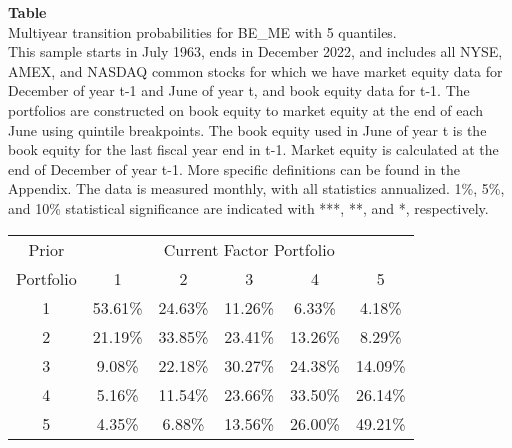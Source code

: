 \begin{table*}[ht!]
\raggedright
{}
\label{tab: multiyear_transition_probs_BE_ME_with_5_quantiles}
\textbf{Table \thetable} \\
Multiyear transition probabilities for BE_ME with 5 quantiles. \\
\hspace*{1em}This sample starts in July 1963, ends in December 2022, and includes all NYSE, AMEX, and NASDAQ common stocks for which we have market equity data for December of year t-1 and June of year t, and book equity data for t-1. The portfolios are constructed on book equity to market equity at the end of each June using quintile breakpoints.  The book equity used in June of year t is the book equity for the last fiscal year end in t-1.  Market equity is calculated at the end of December of year t-1.  More specific definitions can be found in the Appendix.  The data is measured monthly, with all statistics annualized.  1\%, 5\%, and 10\% statistical significance are indicated with ***, **, and *, respectively. \\
\vspace{0.5em}
\centering
\begin{adjustbox}{max width=\textwidth}
\begin{tabular}{@{}cccccc@{}}
\toprule
Prior & \multicolumn{5}{c}{Current Factor Portfolio} \\
Portfolio & 1 & 2 & 3 & 4 & 5 \\
\midrule
1 & 53.61\% & 24.63\% & 11.26\% & 6.33\% & 4.18\% \\
2 & 21.19\% & 33.85\% & 23.41\% & 13.26\% & 8.29\% \\
3 & 9.08\% & 22.18\% & 30.27\% & 24.38\% & 14.09\% \\
4 & 5.16\% & 11.54\% & 23.66\% & 33.50\% & 26.14\% \\
5 & 4.35\% & 6.88\% & 13.56\% & 26.00\% & 49.21\% \\
\bottomrule
\end{tabular}
\end{adjustbox}
\end{table*}